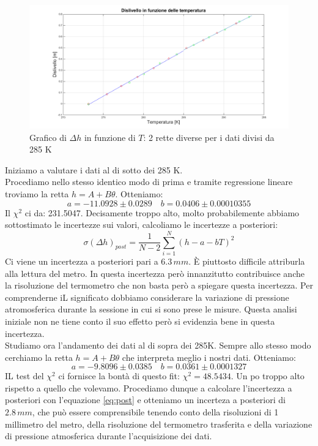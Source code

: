 \begin{figure}[H]
\centering
\includegraphics[width=\textwidth]{img/2}
\caption{Grafico di $\Delta h$ in funzione di $T$: 2 rette diverse per i dati divisi da 285 K}
\end{figure}

Iniziamo a valutare i dati al di sotto dei 285 K.\\
Procediamo nello stesso identico modo di prima e tramite regressione lineare troviamo la retta $h = A+B\theta$.
Otteniamo:
\[a =-11.0928 \pm 0.0289 \quad  b= 0.0406\pm 0.00010355\]
Il $\chi^2$ ci da: 231.5047. Decisamente troppo alto, molto probabilemente abbiamo sottostimato le incertezze sui valori, calcoliamo le incertezze a posteriori:
\begin{equation}
\label{eq:post}
\sigma(\Delta h)_{post} = \frac{1}{N-2}\sum_{i=1}^N(h-a-bT)^2
\end{equation}
Ci viene un incertezza a posteriori pari a $6.3\, mm$. È piuttosto difficile attriburla alla lettura del metro. In questa incertezza però innanzitutto contribuisce anche la risoluzione del termometro che non basta però a spiegare questa incertezza. Per comprenderne iL significato dobbiamo considerare la variazione di pressione atromosferica durante la sessione in cui si sono prese le misure. Questa analisi iniziale non ne tiene conto il suo effetto però si evidenzia bene in questa incertezza.\\
\newline
Studiamo ora l'andamento dei dati al di sopra dei 285K. Sempre allo stesso modo cerchiamo la retta $h = A+B\theta$ che interpreta meglio i nostri dati. Otteniamo:
\[a = -9.8096 \pm 0.0385 \quad  b= 0.0361 \pm 0.0001327\]
IL test del $\chi^2$ ci fornisce la bontà di questo fit: $\chi^2 = 48.5434$. Un po troppo alto rispetto a quello che volevamo. Procediamo dunque a calcolare l'incertezza a posteriori con l'equazione \eqref{eq:post} e otteniamo un incerteza a posteriori di $2.8\, mm$, che può essere comprensibile tenendo conto della risoluzioni di 1 millimetro del metro, della risoluzione del termometro trasferita e della variazione di pressione atmosferica durante l'acquisizione dei dati.


